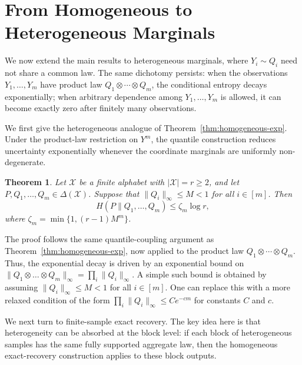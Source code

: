 \documentclass[journal]{IEEEtran}
\newtheorem{theorem}{Theorem}
\def\calX{{\mathcal X}}
\newcommand{\1}{\mathbf{1}}
\begin{document}
\section{From Homogeneous to Heterogeneous Marginals}\label{sec:hetero}
We now extend the main results to heterogeneous marginals, where
\(Y_i\sim Q_i\) need not share a common law. 
The same dichotomy persists: when the observations \(Y_1,\ldots,Y_m\) have product law \(Q_1\otimes\cdots\otimes Q_m\), the conditional entropy decays exponentially; when arbitrary dependence among \(Y_1,\ldots,Y_m\) is allowed,
it can become exactly zero after finitely many observations.



We first give the heterogeneous analogue of
Theorem~\ref{thm:homogeneous-exp}. Under the product-law restriction on
\(Y^m\), the quantile construction reduces uncertainty exponentially whenever
the coordinate marginals are uniformly non-degenerate.
\begin{theorem}\label{thm:heterogeneous-exp}
Let $\calX$ be a finite alphabet with $|\calX|=r\ge2$, and let $P,Q_1,\dots,Q_m\in\Delta(\calX)$. Suppose that $\|Q_i\|_\infty\le M<1$ for all $i\in[m]$. Then
$$H(P\|Q_1,\dots,Q_m)\le \zeta_m\log r,$$
where $\zeta_m=\min\{1,(r-1)M^m\}$.
\end{theorem}
The proof follows the same quantile-coupling argument as
Theorem~\ref{thm:homogeneous-exp}, now applied to the product law
\(Q_1\otimes\cdots\otimes Q_m\). Thus, the exponential decay is driven by an exponential bound on $\|Q_1\otimes \ldots\otimes Q_m\|_\infty = \prod_i\|Q_i\|_\infty$. A simple such bound is obtained by assuming $\|Q_i\|_\infty\le M<1$ for all $i\in[m]$. One can replace this with a more relaxed condition of the
form $\prod_i\|Q_i\|_\infty\leq Ce^{-cm}$ for  constants $C$ and $c$. 

We next turn to finite-sample exact recovery. The key idea here is that
heterogeneity can be absorbed at the block level: if each block of
heterogeneous samples has the same fully supported aggregate law, then the
homogeneous exact-recovery construction applies to these block outputs.
\end{document}
